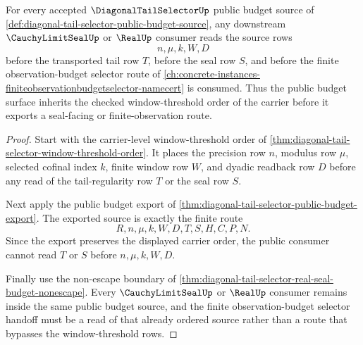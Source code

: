 \begin{theorem}
\label{thm:diagonal-tail-selector-public-budget-threshold-order}
For every accepted $\DiagonalTailSelectorUp$ public budget source of
\autoref{def:diagonal-tail-selector-public-budget-source}, any downstream
$\CauchyLimitSealUp$ or $\RealUp$ consumer reads the source rows
$$
n,\mu,k,W,D
$$
before the transported tail row $T$, before the seal row $S$, and before the
finite observation-budget selector route of
\autoref{ch:concrete-instances-finiteobservationbudgetselector-namecert} is
consumed. Thus the public budget surface inherits the checked
window-threshold order of the carrier before it exports a seal-facing or
finite-observation route.
\end{theorem}
\begin{proof}
Start with the carrier-level window-threshold order of
\autoref{thm:diagonal-tail-selector-window-threshold-order}. It places the
precision row $n$, modulus row $\mu$, selected cofinal index $k$, finite
window row $W$, and dyadic readback row $D$ before any read of the
tail-regularity row $T$ or the seal row $S$.

Next apply the public budget export of
\autoref{thm:diagonal-tail-selector-public-budget-export}. The exported
source is exactly the finite route
$$
R,n,\mu,k,W,D,T,S,H,C,P,N.
$$
Since the export preserves the displayed carrier order, the public consumer
cannot read $T$ or $S$ before $n,\mu,k,W,D$.

Finally use the non-escape boundary of
\autoref{thm:diagonal-tail-selector-real-seal-budget-nonescape}. Every
$\CauchyLimitSealUp$ or $\RealUp$ consumer remains inside the same public
budget source, and the finite observation-budget selector handoff must be a
read of that already ordered source rather than a route that bypasses the
window-threshold rows.
\end{proof}

